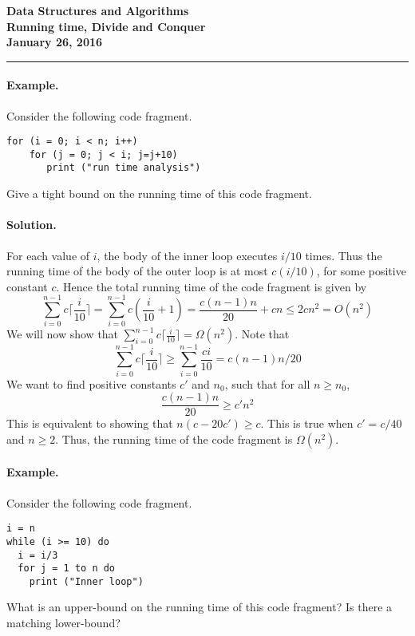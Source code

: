\documentclass[11pt,twoside]{article}
\newcommand{\coursetitle}{Data Structures and Algorithms}
\newcommand{\docdate}{January 26, 2016}
\newcommand{\duedate}{January 26, 2016}
\newcommand{\doctitle}{Running time, Divide and Conquer}
\newcommand{\student}{PUT YOUR NAME HERE}
\newcommand{\ceil}[1]{\lceil#1\rceil}
\begin{document}
\thispagestyle{empty}

\begin{center}
\Large\bf\coursetitle\\[2pt]\doctitle\\ \large\docdate
\end{center}
\vspace*{0.10in}

\hrule

\paragraph{Example.}
Consider the following code fragment.
\begin{verbatim}
for (i = 0; i < n; i++)
    for (j = 0; j < i; j=j+10)
       print ("run time analysis")    
\end{verbatim}
Give a tight bound on the running time of this code fragment.

\paragraph{Solution.}
For each value of $i$, the body of the inner loop executes $i/10$
times. Thus the running time of the body of the outer loop is at most
$c(i/10)$, for some positive constant $c$. Hence the total running time of
the code fragment is given by
\[
\sum_{i=0}^{n-1}c\ceil{\frac{i}{10}} = \sum_{i=0}^{n-1}c\left (\frac{i}{10}+1\right ) = \frac{c(n-1)n}{20} +cn \leq 2cn^2 =O(n^2) 
\]
We will now show that $\sum_{i=0}^{n-1}c\ceil{\frac{i}{10}}=\Omega(n^2)$. Note that 
\[
\sum_{i=0}^{n-1}c\ceil{\frac{i}{10}}\geq \sum_{i=0}^{n-1}\frac{ci}{10} = c(n-1)n/20
\]
We want to
find positive constants $c'$ and $n_0$, such that for all $n\geq n_0$,  
\[
\frac{c(n-1)n}{20} \geq c'n^2
\]
This is equivalent to showing that $n(c-20c')\geq c$. This is true
when $c'=c/40$ and $n\geq 2$. Thus, the running time of the code
fragment is $\Omega(n^2)$.

\paragraph{Example.}
Consider the following code fragment.
\begin{verbatim}
i = n
while (i >= 10) do
  i = i/3
  for j = 1 to n do
    print ("Inner loop")
\end{verbatim}
What is an upper-bound on the running time of this code fragment? Is
there a matching lower-bound?
\end{document}
